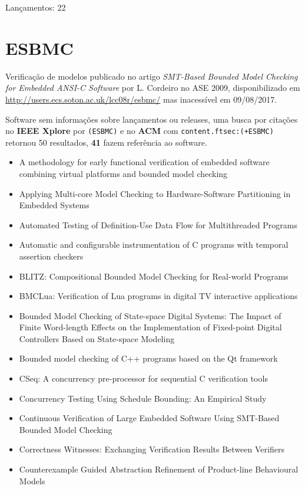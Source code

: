 Lançamentos: 22

\section{ESBMC}

Verificação de modelos
publicado no artigo {\it SMT-Based Bounded Model Checking for Embedded ANSI-C Software}
por L. Cordeiro
no ASE 2009,
disponibilizado em \url{http://users.ecs.soton.ac.uk/lcc08r/esbmc/}
mas inacessível em 09/08/2017.

Software sem informações sobre lançamentos ou releases,
uma busca por citações no {\bf IEEE Xplore} por
\texttt{(ESBMC)}
e no {\bf ACM} com
\texttt{content.ftsec:(+ESBMC)}
retornou
50 resultados,
{\bf 41} fazem referência ao software.

\begin{itemize}
\item A methodology for early functional verification of embedded software combining virtual platforms and bounded model checking
\item Applying Multi-core Model Checking to Hardware-Software Partitioning in Embedded Systems
\item Automated Testing of Definition-Use Data Flow for Multithreaded Programs
\item Automatic and configurable instrumentation of C programs with temporal assertion checkers
\item BLITZ: Compositional Bounded Model Checking for Real-world Programs
\item BMCLua: Verification of Lua programs in digital TV interactive applications
\item Bounded Model Checking of State-space Digital Systems: The Impact of Finite Word-length Effects on the Implementation of Fixed-point Digital Controllers Based on State-space Modeling
\item Bounded model checking of C++ programs based on the Qt framework
\item CSeq: A concurrency pre-processor for sequential C verification tools
\item Concurrency Testing Using Schedule Bounding: An Empirical Study
\item Continuous Verification of Large Embedded Software Using SMT-Based Bounded Model Checking
\item Correctness Witnesses: Exchanging Verification Results Between Verifiers
\item Counterexample Guided Abstraction Refinement of Product-line Behavioural Models

\end{itemize}
